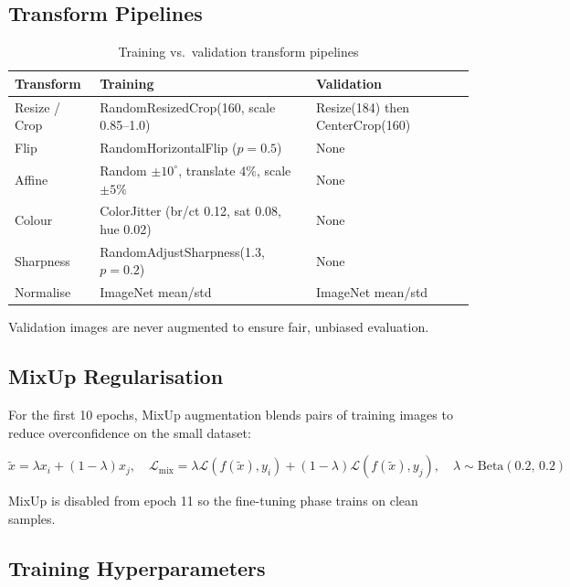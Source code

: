 \documentclass[12pt,a4paper]{article}
\begin{document}
\subsection{Transform Pipelines}

\begin{table}[H]
\centering\small
\caption{Training vs.\ validation transform pipelines}
\renewcommand{\arraystretch}{1.2}
\begin{tabular}{@{}p{3.4cm}p{4.6cm}p{3.8cm}@{}}
\toprule
\textbf{Transform} & \textbf{Training} & \textbf{Validation} \\
\midrule
\rowcolor{lightblue!20} Resize / Crop &
  RandomResizedCrop(160, scale 0.85--1.0) &
  Resize(184) then CenterCrop(160) \\
Flip & RandomHorizontalFlip ($p=0.5$) & None \\
\rowcolor{lightblue!20} Affine &
  Random $\pm10^{\circ}$, translate $4\%$, scale $\pm5\%$ & None \\
Colour & ColorJitter (br/ct 0.12, sat 0.08, hue 0.02) & None \\
\rowcolor{lightblue!20} Sharpness & RandomAdjustSharpness(1.3, $p=0.2$) & None \\
Normalise & ImageNet mean/std & ImageNet mean/std \\
\bottomrule
\end{tabular}
\end{table}

\noindent Validation images are never augmented to ensure fair, unbiased evaluation.

\subsection{MixUp Regularisation}
For the first 10 epochs, MixUp augmentation blends pairs of training images to reduce
overconfidence on the small dataset:

\begin{equation}
  \tilde{x} = \lambda x_i + (1-\lambda)x_j, \quad
  \mathcal{L}_\text{mix} = \lambda\mathcal{L}(f(\tilde{x}),y_i)
  + (1-\lambda)\mathcal{L}(f(\tilde{x}),y_j), \quad
  \lambda \sim \text{Beta}(0.2,\,0.2)
\end{equation}

MixUp is disabled from epoch 11 so the fine-tuning phase trains on clean samples.

\subsection{Training Hyperparameters}
\end{document}
